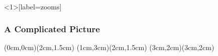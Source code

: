 \documentclass{beamer}
\begin{document}
\begin{frame}<1>[label=zooms]
  \frametitle<1>{A Complicated Picture}
  (0cm,0cm)(2cm,1.5cm)
  (1cm,3cm)(2cm,1.5cm)
  (3cm,2cm)(3cm,2cm)
\end{frame}
\end{document}
